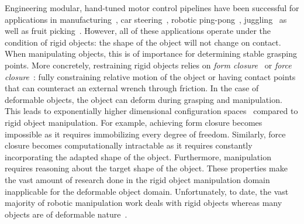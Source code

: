 \documentclass[\home/main.tex]{subfiles}
\begin{document}
Engineering modular, hand-tuned motor control pipelines have been successful for applications in manufacturing~\autocite{Clocksin1985,Mochizuki1987}, car steering~\autocite{Dickmanns1988}, robotic ping-pong~\autocite{Andersson1987}, juggling~\autocite{Rizzi1993} as well as fruit picking~\autocite{Harrell1989}. However, all of these applications operate under the condition of rigid objects: the shape of the object will not change on contact. When manipulating objects, this is of importance for determining stable grasping points. More concretely, restraining rigid objects relies on \textit{form closure}~\autocite{Nguyen1988} or \textit{force closure}~\autocite{Bicchi1995}: fully constraining relative motion of the object or having contact points that can counteract an external wrench through friction. %
In the case of deformable objects, the object can deform during grasping and manipulation. This leads to exponentially higher dimensional configuration spaces~\autocite{Foresti2004} compared to rigid object manipulation. For example, achieving form closure becomes impossible as it requires immobilizing every degree of freedom. Similarly, force closure becomes computationally intractable as it requires constantly incorporating the adapted shape of the object. Furthermore, manipulation requires reasoning about the target shape of the object. These properties make the vast amount of research done in the rigid object manipulation domain inapplicable for the deformable object domain. Unfortunately, to date, the vast majority of robotic manipulation work deals with rigid objects whereas many objects are of deformable nature~\autocite{Siciliano2008}.
\end{document}
